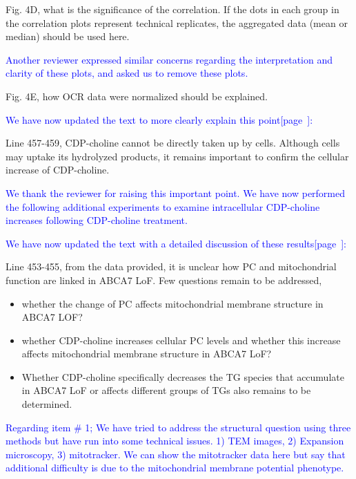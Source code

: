 Fig. 4D, what is the significance of the correlation. If the dots in each group in the correlation plots represent technical replicates, the aggregated data (mean or median) should be used here.

\textcolor{blue}{Another reviewer expressed similar concerns regarding the interpretation and clarity of these plots, and asked us to remove these plots.}

Fig. 4E, how OCR data were normalized should be explained.

\textcolor{blue}{We have now updated the text to more clearly explain this point[page~\pageref{quoteC-label}]:}
\begin{quote}
	\quoteC
\end{quote}

Line 457-459, CDP-choline cannot be directly taken up by cells. Although cells may uptake its hydrolyzed products, it remains important to confirm the cellular increase of CDP-choline.

\textcolor{blue}{We thank the reviewer for raising this important point. We have now performed the following additional experiments to examine intracellular CDP-choline increases following CDP-choline treatment.}

\textcolor{blue}{We have now updated the text with a detailed discussion of these results[page~\pageref{quoteD-label}]:}
\begin{quote}
	\quoteD
\end{quote}


Line 453-455, from the data provided, it is unclear how PC and mitochondrial function are linked in ABCA7 LoF. Few questions remain to be addressed,
\begin{itemize}
	\item whether the change of PC affects mitochondrial membrane structure in ABCA7 LOF?

	\item whether CDP-choline increases cellular PC levels and whether this increase affects mitochondrial membrane structure in ABCA7 LoF?
	
	\item Whether CDP-choline specifically decreases the TG species that accumulate in ABCA7 LoF or affects different groups of TGs also remains to be determined.
\end{itemize}

\textcolor{blue}{Regarding item # 1; We have tried to address the structural question using three methods but have run into some technical issues. 1) TEM images, 2) Expansion microscopy, 3) mitotracker. We can show the mitotracker data here but say that additional difficulty is due to the mitochondrial membrane potential phenotype.}

